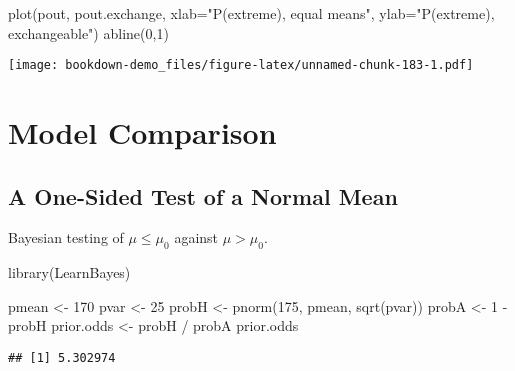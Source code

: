 \documentclass[
]{book}
\newenvironment{Shaded}{\begin{snugshade}}{\end{snugshade}}
\newcommand{\AttributeTok}[1]{\textcolor[rgb]{0.77,0.63,0.00}{#1}}
\newcommand{\DecValTok}[1]{\textcolor[rgb]{0.00,0.00,0.81}{#1}}
\newcommand{\FunctionTok}[1]{\textcolor[rgb]{0.00,0.00,0.00}{#1}}
\newcommand{\NormalTok}[1]{#1}
\newcommand{\OtherTok}[1]{\textcolor[rgb]{0.56,0.35,0.01}{#1}}
\newcommand{\SpecialCharTok}[1]{\textcolor[rgb]{0.00,0.00,0.00}{#1}}
\newcommand{\StringTok}[1]{\textcolor[rgb]{0.31,0.60,0.02}{#1}}
\begin{document}
\begin{Shaded}
\begin{Highlighting}[]
\FunctionTok{plot}\NormalTok{(pout, pout.exchange,}
     \AttributeTok{xlab=}\StringTok{"P(extreme), equal means"}\NormalTok{,}
     \AttributeTok{ylab=}\StringTok{"P(extreme), exchangeable"}\NormalTok{)}
\FunctionTok{abline}\NormalTok{(}\DecValTok{0}\NormalTok{,}\DecValTok{1}\NormalTok{)}
\end{Highlighting}
\end{Shaded}

\texttt{[image: bookdown-demo\_files/figure-latex/unnamed-chunk-183-1.pdf]}

\hypertarget{model-comparison}{%
\chapter{Model Comparison}\label{model-comparison}}

\hypertarget{a-one-sided-test-of-a-normal-mean}{%
\section{A One-Sided Test of a Normal Mean}\label{a-one-sided-test-of-a-normal-mean}}

Bayesian testing of \(\mu \le \mu_0\) against \(\mu > \mu_0\).

\begin{Shaded}
\begin{Highlighting}[]
\FunctionTok{library}\NormalTok{(LearnBayes)}
\end{Highlighting}
\end{Shaded}

\begin{Shaded}
\begin{Highlighting}[]
\NormalTok{pmean }\OtherTok{\textless{}{-}} \DecValTok{170}
\NormalTok{pvar }\OtherTok{\textless{}{-}} \DecValTok{25}
\NormalTok{probH }\OtherTok{\textless{}{-}} \FunctionTok{pnorm}\NormalTok{(}\DecValTok{175}\NormalTok{, pmean, }\FunctionTok{sqrt}\NormalTok{(pvar))}
\NormalTok{probA }\OtherTok{\textless{}{-}} \DecValTok{1} \SpecialCharTok{{-}}\NormalTok{ probH}
\NormalTok{prior.odds }\OtherTok{\textless{}{-}}\NormalTok{ probH }\SpecialCharTok{/}\NormalTok{ probA}
\NormalTok{prior.odds}
\end{Highlighting}
\end{Shaded}

\begin{verbatim}
## [1] 5.302974
\end{verbatim}
\end{document}
